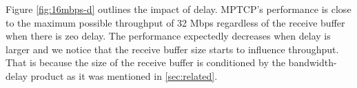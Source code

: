 Figure \ref{fig:16mbps-d} outlines the impact of delay. MPTCP's performance is close to the maximum possible throughput of 32 Mbps regardless of the receive buffer when there is zeo delay. The performance expectedly decreases when delay is larger and we notice that the receive buffer size starts to influence throughput. That is because the size of the receive buffer is conditioned by the bandwidth-delay product as it was mentioned in \ref{sec:related}.



